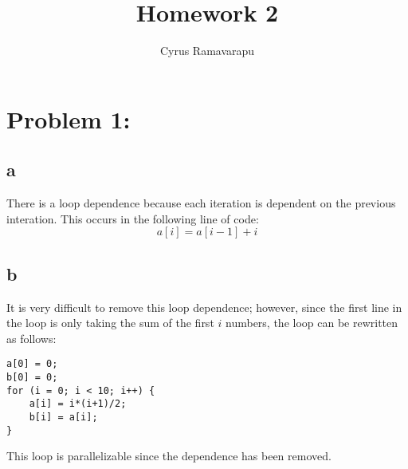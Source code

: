 \documentclass{article}
\begin{document}
\title{Homework 2}
\author{Cyrus Ramavarapu}
\renewcommand{\today}{29 September 2016}
\maketitle

\section*{Problem 1:}
\subsection*{a}
There is a loop dependence because each iteration is dependent
on the previous interation.  This occurs in the following line
of code:\\
\[
a[i]=a[i-1]+i
\]
\subsection*{b}
It is very difficult to remove this loop dependence; however,
since the first line in the loop is only taking the sum of
the first $i$ numbers, the loop can be rewritten as follows:\\
\begin{lstlisting}
a[0] = 0;
b[0] = 0;
for (i = 0; i < 10; i++) {
    a[i] = i*(i+1)/2;
    b[i] = a[i];
}
\end{lstlisting}
This loop is parallelizable since the dependence has been removed. 
\end{document}
